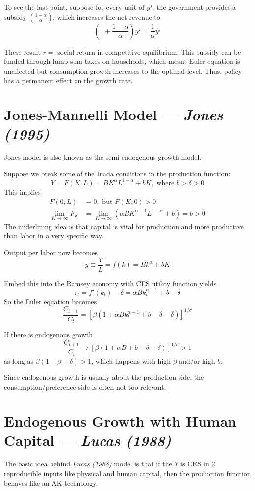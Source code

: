 \documentclass[twocolumn, fleqn]{article}
\begin{document}
			To see the last point, suppose for every unit of $y^j$, the government provides a subsidy
				$(\frac{1-\alpha}{\alpha})$, which increases the net revenue to
				\[\left( 1+\frac{1-\alpha}{\alpha} \right)y^j = \frac{1}{\alpha}y^j\]

			These result $r = $ social return in competitive equilibrium.
			This subsidy can be funded through lump sum taxes on households, which meant Euler equation is unaffected
			but consumption growth increases to the optimal level.
			Thus, policy has a permanent effect on the growth rate. 
	
	\section{Jones-Mannelli Model --- \textit{Jones (1995)}}
		Jones model is also known as the semi-endogenous growth model.

		Suppose we break some of the Inada conditions in the production function:
		\[Y=F(K,L)=BK^\alpha L^{1-\alpha}+bK, \text{ where } b > \delta >0\]
		This implies
		\begin{align*}
			F(0,L) &=0, \text{ but } F(K,0)>0\\
			\lim_{K\rightarrow \infty}F_K &= \lim_{K\rightarrow \infty} (\alpha B K^{\alpha-1}L^{1-\alpha}+b)=b>0
		\end{align*}
		The underlining idea is that capital is vital for production and more productive than labor in a very
		specific way.

		Output per labor now becomes
		\[y \equiv \frac{Y}{L} = f(k) = Bk^\alpha + b K\]

		Embed this into the Ramsey economy with CES utility function yields
		\[r_t = f'(k_t)-\delta = \alpha B k_t^{\alpha-1}+b-\delta\]
		So the Euler equation becomes
		\[\frac{C_{t+1}}{C_{t}}= [\beta(1+\alpha B k_t^{\alpha-1}+b-\delta-\delta)]^{1/\sigma}\]

		If there is endogenous growth
		\[\frac{C_{t+1}}{C_{t}} \rightarrow [\beta(1+\alpha B +b-\delta-\delta)]^{1/\sigma}>1\]
		as long as $\beta (1+\beta -\delta)>1$, which happens with high $\beta$ and/or high $b$.

		\begin{note}
			Since endogenous growth is usually about the production side, the consumption/preference side is often
			not too relevant.
		\end{note}

	\section{Endogenous Growth with Human Capital --- \textit{Lucas (1988)}}
		The basic idea behind \textit{Lucas (1988)} model is that if the $Y$ is CRS in 2 reproducible inputs like
		physical and human capital, then the production function behaves like an AK technology.
\end{document}
